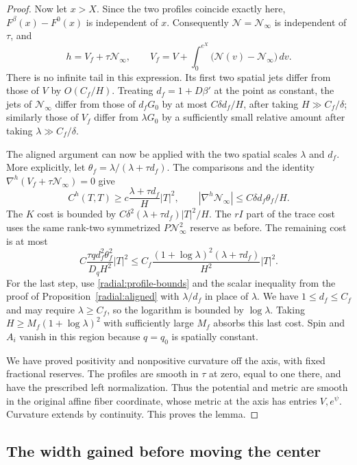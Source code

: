 \begin{proof}
Now let $x>X$. Since the two profiles coincide exactly here, $F^\beta(x)-F^0(x)$ is independent of $x$. Consequently $\mathcal N=\mathcal N_\infty$ is independent of $\tau$, and
\begin{equation}\label{center:finite-tail}
 h=V_f+\tau\mathcal N_\infty,
 \qquad V_f=V+\int_0^{e^X}
          \bigl(\mathcal N(v)-\mathcal N_\infty\bigr)\,dv.
\end{equation}
There is no infinite tail in this expression. Its first two spatial jets differ from those of $V$ by $O(C_f/H)$. Treating $d_f=1+D\beta'$ at the point as constant, the jets of $\mathcal N_\infty$ differ from those of $d_fG_0$ by at most $C\delta d_f/H$, after taking $H\gg C_f/\delta$; similarly those of $V_f$ differ from $\lambda G_0$ by a sufficiently small relative amount after taking $\lambda\gg C_f/\delta$.

The aligned argument can now be applied with the two spatial scales $\lambda$ and $d_f$. More explicitly, let $\theta_f=\lambda/(\lambda+\tau d_f)$. The comparisons and the identity $\nabla^h(V_f+\tau\mathcal N_\infty)=0$ give
\[
 C^h(T,T)\ge c\frac{\lambda+\tau d_f}{H}|T|^2,
 \qquad |\nabla^h\mathcal N_\infty|
                   \le C\delta d_f\theta_f/H.
\]
The $K$ cost is bounded by $C\delta^2(\lambda+\tau d_f)|T|^2/H$. The $rI$ part of the trace cost uses the same rank-two symmetrized $P\mathcal N_\infty^2$ reserve as before. The remaining cost is at most
\[
 C\frac{\tau qd_f^2\theta_f^2}{D_qH^2}|T|^2
 \le C_f\frac{(1+\log\lambda)^2(\lambda+\tau d_f)}{H^2}|T|^2.
\]
For the last step, use \eqref{radial:profile-bounds} and the scalar inequality from the proof of Proposition~\ref{radial:aligned} with $\lambda/d_f$ in place of $\lambda$. We have $1\le d_f\le C_f$ and may require $\lambda\ge C_f$, so the logarithm is bounded by $\log\lambda$. Taking $H\ge M_f(1+\log\lambda)^2$ with sufficiently large $M_f$ absorbs this last cost. Spin and $A_i$ vanish in this region because $q=q_0$ is spatially constant.

We have proved positivity and nonpositive curvature off the axis, with fixed fractional reserves. The profiles are smooth in $\tau$ at zero, equal to one there, and have the prescribed left normalization. Thus the potential and metric are smooth in the original affine fiber coordinate, whose metric at the axis has entries $V,e^\psi$. Curvature extends by continuity. This proves the lemma.
\end{proof}

\subsection{The width gained before moving the center}

